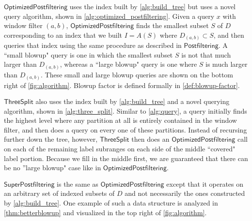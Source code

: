 \documentclass{article}
\theoremstyle{plain}
\theoremstyle{definition}
\theoremstyle{remark}
\newcommand{\algname}[1]{\ensuremath{\mathsf{#1}}}
\begin{document}
\begin{list}{\textbullet}{%
    \setlength{\leftmargin}{0.5em}
    \setlength{\itemindent}{0em}
    \setlength{\labelwidth}{\itemindent}
    \setlength{\labelsep}{0.5em}
    \setlength{\listparindent}{1em}
    \setlength{\itemsep}{0em}
    \setlength{\parsep}{0em}
    \setlength{\topsep}{0em}
    \setlength{\partopsep}{0em}
}


    \item \algname{Optimized Postfiltering} uses the index built by \cref{alg:build_tree} but uses a novel query algorithm, shown in \cref{alg:optimized_postfiltering}. Given a query $x$ with window filter $(a, b)$, \algname{Optimized Postfiltering} finds the smallest subset $S$ of $D$ corresponding to an index that we built $I = A(S)$ where $D_{(a, b)} \subset S$, and then queries that index using the same procedure as described in \algname{Postfiltering}. A ``small blowup" query is one in which the smallest subset $S$ is not that much larger than $D_{(a, b)}$, whereas a ``large blowup" query is one where $S$ is much larger than $D_{(a, b)}$. These small and large blowup queries are shown on the bottom right of \cref{fig:algorithm}. Blowup factor is defined formally in \cref{def:blowup-factor}.

    \item \algname{Three Split} also uses the index built by \cref{alg:build_tree} and a novel querying algorithm, shown in \cref{alg:three_split}. Similar to  \cref{alg:query}, a query initially finds the highest level where any partition at all is entirely contained in the window filter, and then does a query on every one of these partitions. Instead of recursing further down the tree, however, \algname{Three Split} then does an \algname{Optimized Postfiltering} call on each of the remaining label subranges on each side of the middle ``covered" label portion. Because we fill in the middle first, we are guaranteed that there can be no ''large blowup" case like in \algname{Optimized Postfiltering}.
    
    \item \algname{Super Postfiltering} is the same as \algname{Optimized Postfiltering} except that it operates on an arbitrary set of indexed subsets of $D$ and not necessarily the ones constructed by \cref{alg:build_tree}. One example of such a data structure is analyzed in \cref{thm:betterblowup} and visualized in the top right of \cref{fig:algorithm}.



\end{list}
\end{document}
